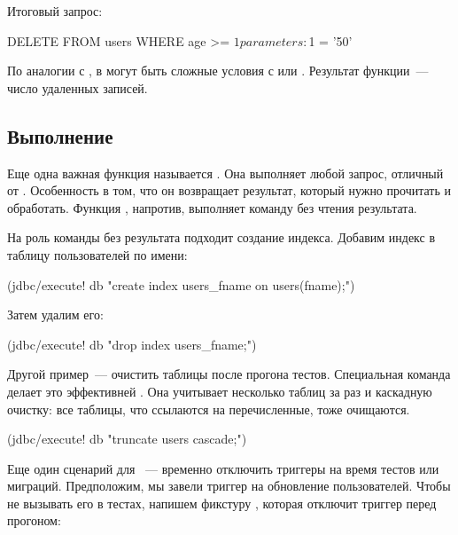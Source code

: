 Итоговый запрос:

\begin{english}
  \begin{sql}
DELETE FROM users WHERE age >= $1
parameters: $1 = '50'
  \end{sql}
\end{english}

По аналогии с , в  могут быть сложные условия с  или . Результат функции~--- число удаленных записей.

\subsection{Выполнение}

Еще одна важная функция называется . Она выполняет любой запрос, отличный от . Особенность  в том, что он возвращает результат, который нужно прочитать и обработать. Функция , напротив, выполняет команду без чтения результата.

На роль команды без результата подходит создание индекса. Добавим индекс в таблицу пользователей по имени:

\begin{english}
  \begin{clojure}
(jdbc/execute! db
  "create index users_fname on users(fname);")
  \end{clojure}
\end{english}

Затем удалим его:

\begin{english}
  \begin{clojure}
(jdbc/execute! db "drop index users_fname;")
  \end{clojure}
\end{english}

Другой пример~--- очистить таблицы после прогона тестов. Специальная команда  делает это эффективней . Она учитывает несколько таблиц за раз и каскадную очистку: все таблицы, что ссылаются на перечисленные, тоже очищаются.

\begin{english}
  \begin{clojure}
(jdbc/execute! db "truncate users cascade;")
  \end{clojure}
\end{english}

Еще один сценарий для ~--- временно отключить триггеры на время тестов или миграций. Предположим, мы завели триггер на обновление пользователей. Чтобы не вызывать его в тестах, напишем фикстуру , которая отключит триггер перед прогоном:

